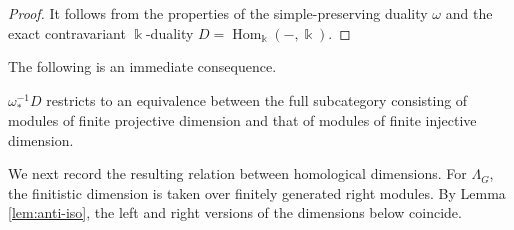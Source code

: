 \documentclass[a4paper,leqno]{amsart}
\begin{document}
\begin{proof}
It follows from the properties of the simple-preserving duality $\omega$ and the exact contravariant $\Bbbk$-duality $D=\operatorname{Hom}_{\Bbbk}(-,\Bbbk)$.
\end{proof}

The following is an immediate consequence.
\begin{cor}\label{cor:fdim symmetry}
    $\omega_*^{-1}D$ restricts to an equivalence between the full subcategory consisting of modules of finite projective dimension and that of modules of finite injective dimension.
\end{cor}

We next record the resulting relation between homological dimensions.
For $\Lambda_G$, the finitistic dimension is taken over finitely
generated right modules.  By Lemma \ref{lem:anti-iso}, the left and right versions of the dimensions below coincide.
\end{document}
